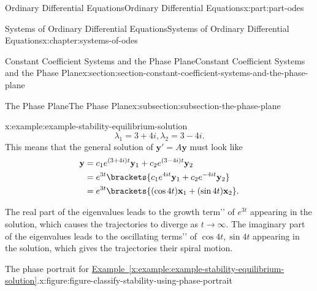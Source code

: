 \documentclass[oneside,10pt,]{book}
\newcommand{\xreffont}{\relax}
\numberwithin{equation}{part}
\renewcommand{\vec}[1]{\mathbf{#1}}
\newcommand{\amp}{&}
\begin{document}
\begin{partptx}{Ordinary Differential Equations}{}{Ordinary Differential Equations}{}{}{x:part:part-odes}
\begin{chapterptx}{Systems of Ordinary Differential Equations}{}{Systems of Ordinary Differential Equations}{}{}{x:chapter:systems-of-odes}
\begin{sectionptx}{Constant Coefficient Systems and the Phase Plane}{}{Constant Coefficient Systems and the Phase Plane}{}{}{x:section:section-constant-coefficient-systems-and-the-phase-plane}
\begin{subsectionptx}{The Phase Plane}{}{The Phase Plane}{}{}{x:subsection:subsection-the-phase-plane}
\begin{example}{}{x:example:example-stability-equilibrium-solution}
\begin{equation*}
\lambda_{1} = 3+4i,\lambda_{2} = 3-4i.
\end{equation*}
This means that the general solution of \(\vec{y}' = A\vec{y}\) must look like%
\begin{align*}
\vec{y} \amp = c_{1}e^{(3+4i)t}\vec{y}_{1} + c_{2}e^{(3-4i)t}\vec{y}_{2}\\
\amp = e^{3t}\brackets{c_{1}e^{4it}\vec{y}_{1}+c_{2}e^{-4it}\vec{y}_{2}}\\
\amp = e^{3t}\brackets{(\cos4t)\vec{x}_{1}+(\sin4t)\vec{x}_{2}}\text{.}
\end{align*}
%
\par
The real part of the eigenvalues leads to the \textasciigrave{}\textasciigrave{}growth term'{}'{} of \(e^{3t}\) appearing in the solution, which causes the trajectories to diverge as \(t\to\infty\). The imaginary part of the eigenvalues leads to the \textasciigrave{}\textasciigrave{}oscillating terms'{}'{} of \(\cos4t,\sin4t\) appearing in the solution, which gives the trajectories their spiral motion.%
\end{example}
\begin{figureptx}{The phase portrait for \hyperref[x:example:example-stability-equilibrium-solution]{Example~{\xreffont\ref{x:example:example-stability-equilibrium-solution}}}.}{x:figure:figure-classify-stability-using-phase-portrait}{}%
\begin{image}{0.25}{0.5}{0.25}%

\end{image}
\end{figureptx}
\end{subsectionptx}
\end{sectionptx}
\end{chapterptx}
\end{partptx}
\end{document}
